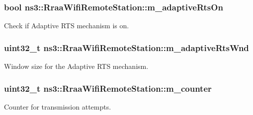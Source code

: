 \subsubsection[{\texorpdfstring{m\+\_\+adaptive\+Rts\+On}{m_adaptiveRtsOn}}]{\setlength{\rightskip}{0pt plus 5cm}bool ns3\+::\+Rraa\+Wifi\+Remote\+Station\+::m\+\_\+adaptive\+Rts\+On}\hypertarget{structns3_1_1RraaWifiRemoteStation_abae3a71d995dac8fc4e0f3bf4074d79e}{}\label{structns3_1_1RraaWifiRemoteStation_abae3a71d995dac8fc4e0f3bf4074d79e}


Check if Adaptive R\+TS mechanism is on. 

\subsubsection[{\texorpdfstring{m\+\_\+adaptive\+Rts\+Wnd}{m_adaptiveRtsWnd}}]{\setlength{\rightskip}{0pt plus 5cm}uint32\+\_\+t ns3\+::\+Rraa\+Wifi\+Remote\+Station\+::m\+\_\+adaptive\+Rts\+Wnd}\hypertarget{structns3_1_1RraaWifiRemoteStation_aa08bbae02d96d903c975ead8b68efe30}{}\label{structns3_1_1RraaWifiRemoteStation_aa08bbae02d96d903c975ead8b68efe30}


Window size for the Adaptive R\+TS mechanism. 

\subsubsection[{\texorpdfstring{m\+\_\+counter}{m_counter}}]{\setlength{\rightskip}{0pt plus 5cm}uint32\+\_\+t ns3\+::\+Rraa\+Wifi\+Remote\+Station\+::m\+\_\+counter}\hypertarget{structns3_1_1RraaWifiRemoteStation_a4ffb57dc3c6e3dfa5120d5b96e9d33ed}{}\label{structns3_1_1RraaWifiRemoteStation_a4ffb57dc3c6e3dfa5120d5b96e9d33ed}


Counter for transmission attempts. 


